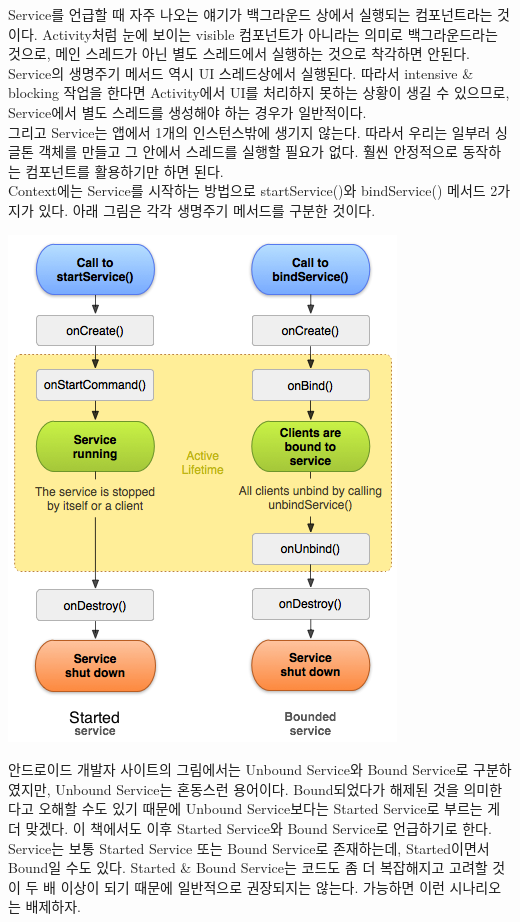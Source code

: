 Service를 언급할 때 자주 나오는 얘기가 백그라운드 상에서 실행되는 컴포넌트라는 것이다. Activity처럼 눈에 보이는 visible 컴포넌트가 아니라는 의미로 백그라운드라는 것으로, 메인 스레드가 아닌 별도 스레드에서 실행하는 것으로 착각하면 안된다.
Service의 생명주기 메서드 역시 UI 스레드상에서 실행된다. 
따라서 intensive \& blocking 작업을 한다면 Activity에서 UI를 처리하지 못하는 상황이 생길 수 있으므로, Service에서 별도 스레드를 생성해야 하는 경우가 일반적이다.\\

그리고 Service는 앱에서 1개의 인스턴스밖에 생기지 않는다. 따라서 우리는 일부러 싱글톤 객체를 만들고 그 안에서 스레드를 실행할 필요가 없다. 훨씬 안정적으로 동작하는 컴포넌트를 활용하기만 하면 된다.\\

Context에는 Service를 시작하는 방법으로 startService()와 bindService() 메서드 2가지가 있다. 아래 그림은 각각 생명주기 메서드를 구분한 것이다. 

\includegraphics[scale=0.7]{service-lifecycle}

안드로이드 개발자 사이트의 그림에서는 Unbound Service와 Bound Service로 구분하였지만, Unbound Service는 혼동스런 용어이다. Bound되었다가 해제된 것을 의미한다고 오해할 수도 있기 때문에 Unbound Service보다는 Started Service로 부르는 게 더 맞겠다. 이 책에서도 이후 Started Service와 Bound Service로 언급하기로 한다.\\

Service는 보통 Started Service 또는 Bound Service로 존재하는데, Started이면서 Bound일 수도 있다.  Started \& Bound Service는 코드도 좀 더 복잡해지고 고려할 것이 두 배 이상이 되기 때문에 일반적으로 권장되지는 않는다. 가능하면 이런 시나리오는 배제하자.


